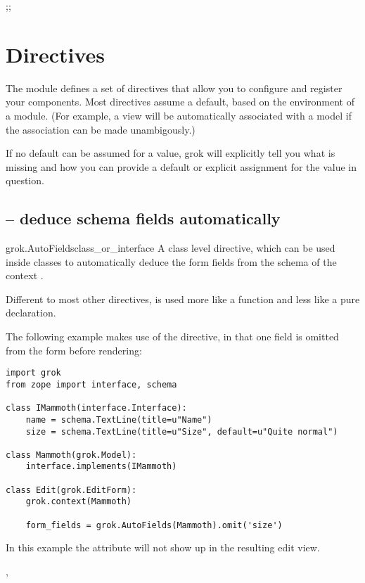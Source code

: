 ;;\chapter{Directives}

The  module defines a set of directives that allow you to
configure and register your components. Most directives assume a
default, based on the environment of a module. (For example, a view
will be automatically associated with a model if the association can
be made unambigously.)

If no default can be assumed for a value, grok will explicitly tell
you what is missing and how you can provide a default or explicit
assignment for the value in question.


    \section{ -- deduce schema fields automatically}

        \begin{funcdesc}{grok.AutoFields}{class_or_interface}
          A class level directive, which can be used inside
           classes to automatically deduce the form fields
          from the schema of the context .

          Different to most other directives,
           is used more like a function and
          less like a pure declaration.

          The following example makes use of the
           directive, in that one field is
          omitted from the form before rendering:


          \begin{verbatim}
import grok
from zope import interface, schema

class IMammoth(interface.Interface):
    name = schema.TextLine(title=u"Name")
    size = schema.TextLine(title=u"Size", default=u"Quite normal")

class Mammoth(grok.Model):
    interface.implements(IMammoth)

class Edit(grok.EditForm):
    grok.context(Mammoth)

    form_fields = grok.AutoFields(Mammoth).omit('size')
          \end{verbatim}

          In this example the  attribute will not show up
          in the resulting edit view.

          \begin{seealso}
            , 
          \end{seealso}

        \end{funcdesc}

